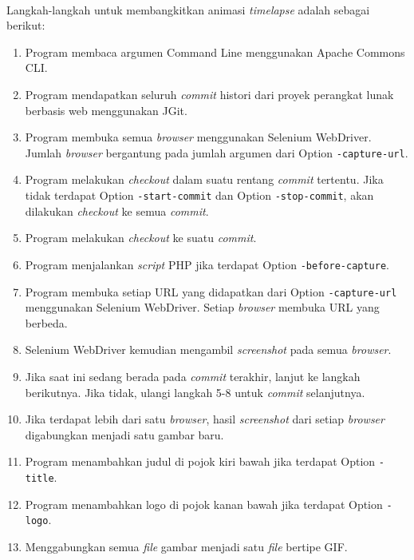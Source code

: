 \ \\

Langkah-langkah untuk membangkitkan animasi \textit{timelapse} adalah sebagai berikut:\\
\begin{enumerate}
\item Program membaca argumen Command Line menggunakan Apache Commons CLI.
\item Program mendapatkan seluruh \textit{commit} histori dari proyek perangkat lunak berbasis web menggunakan JGit.
\item Program membuka semua \textit{browser} menggunakan Selenium WebDriver. Jumlah \textit{browser} bergantung pada jumlah argumen dari Option \texttt{-capture-url}.
\item Program melakukan \textit{checkout} dalam suatu rentang \textit{commit} tertentu. Jika tidak terdapat Option \texttt{-start-commit} dan Option \texttt{-stop-commit}, akan dilakukan \textit{checkout} ke semua \textit{commit}.
\item Program melakukan \textit{checkout} ke suatu \textit{commit}. 
\item Program menjalankan \textit{script} PHP jika terdapat Option \texttt{-before-capture}.
\item Program membuka setiap URL yang didapatkan dari Option \texttt{-capture-url} menggunakan Selenium WebDriver. Setiap \textit{browser} membuka URL yang berbeda.
\item Selenium WebDriver kemudian mengambil \textit{screenshot} pada semua \textit{browser}.
\item Jika saat ini sedang berada pada \textit{commit} terakhir, lanjut ke langkah berikutnya. Jika tidak, ulangi langkah 5-8 untuk \textit{commit} selanjutnya.
\item Jika terdapat lebih dari satu \textit{browser}, hasil \textit{screenshot} dari setiap \textit{browser} digabungkan menjadi satu gambar baru. 
\item Program menambahkan judul di pojok kiri bawah jika terdapat Option \texttt{-title}.
\item Program menambahkan logo di pojok kanan bawah jika terdapat Option \texttt{-logo}.  
\item Menggabungkan semua \textit{file} gambar menjadi satu \textit{file} bertipe GIF.
\end{enumerate}

